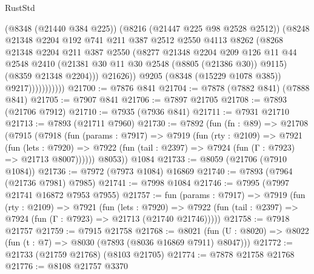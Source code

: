 \begin{lexlean}{RustStd}
\begin{coremodule}
                            (@8348 (@21440 @384 @225))
                            (@8216 (@21447 @225 @98 @2528 @2512))
                            (@8248
                              @21348
                              @2204
                              @192
                              @741
                              @211
                              @387
                              @2512
                              @2550
                              @4113
                              @8262
                              (@8268
                                @21348
                                @2204
                                @211
                                @387
                                @2550
                                (@8277
                                  @21348
                                  @2204
                                  @209
                                  @126
                                  @11
                                  @44
                                  @2548
                                  @2410
                                  (@21381 @30 @11 @30 @2548 (@8805 (@21386 @30)) @9115)
                                  (@8359 @21348 @2204)))
                              @21626))
                          @9205
                          (@8348 (@15229 @1078 @385))
                          @9217)))))))))))
@21700 := @7876 @841
@21704 := @7878 (@7882 @841) (@7888 @841)
@21705 := @7907 @841
@21706 := @7897 @21705
@21708 := @7893 (@21706 @7912)
@21710 := @7935 (@7936 @841)
@21711 := @7931 @21710
@21713 := @7893 (@21711 @7960)
@21730 := @7892
    (fun (fn : @89) =>
    @21708
      (@7915
        (@7918
          (fun (params : @7917) =>
          @7919
            (fun (rty : @2109) =>
            @7921
              (fun (lets : @7920) =>
              @7922 (fun (tail : @2397) => @7924 (fun (Γ : @7923) => @21713 @8007))))))
        @8053))
    @1084
@21733 := @8059 (@21706 (@7910 @1084))
@21736 := @7972 (@7973 @1084) @16869
@21740 := @7893 (@7964 (@21736 @7981) @7985)
@21741 := @7998 @1084
@21746 := @7995 (@7997 @21741 @16872 @7953 @7955)
@21757 := fun (params : @7917) =>
  @7919
    (fun (rty : @2109) =>
    @7921
      (fun (lets : @7920) =>
      @7922 (fun (tail : @2397) => @7924 (fun (Γ : @7923) => @21713 (@21740 @21746)))))
@21758 := @7918 @21757
@21759 := @7915 @21758
@21768 := @8021
    (fun (U : @8020) => @8022 (fun (t : @7) => @8030 (@7893 (@8036 @16869 @7911) @8047)))
@21772 := @21733 (@21759 @21768) (@8103 @21705)
@21774 := @7878 @21758 @21768
@21776 := @8108 @21757 @3370

\end{coremodule}
\end{lexlean}
